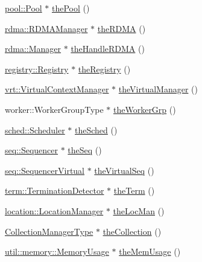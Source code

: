 \begin{DoxyCompactItemize}
\item 
\hyperlink{structvt_1_1pool_1_1_pool}{pool\+::\+Pool} $\ast$ \hyperlink{namespacevt_aab3530d89a64e5ea903b0ccf303ecbb7}{the\+Pool} ()
\item 
\hyperlink{structvt_1_1rdma_1_1_r_d_m_a_manager}{rdma\+::\+R\+D\+M\+A\+Manager} $\ast$ \hyperlink{namespacevt_a68b8410bc2b86d3b5228d7dbb6b40bac}{the\+R\+D\+MA} ()
\item 
\hyperlink{structvt_1_1rdma_1_1_manager}{rdma\+::\+Manager} $\ast$ \hyperlink{namespacevt_aecb87ec2c40b5b7fc57ba4cf8ea838b0}{the\+Handle\+R\+D\+MA} ()
\item 
\hyperlink{structvt_1_1registry_1_1_registry}{registry\+::\+Registry} $\ast$ \hyperlink{namespacevt_a8b5994a5aedabc64006ce820db2e938c}{the\+Registry} ()
\item 
\hyperlink{structvt_1_1vrt_1_1_virtual_context_manager}{vrt\+::\+Virtual\+Context\+Manager} $\ast$ \hyperlink{namespacevt_ad46b232b74b745991314a4a509c648f9}{the\+Virtual\+Manager} ()
\item 
worker\+::\+Worker\+Group\+Type $\ast$ \hyperlink{namespacevt_a863076a26364a6b752199a556e54fd60}{the\+Worker\+Grp} ()
\item 
\hyperlink{structvt_1_1sched_1_1_scheduler}{sched\+::\+Scheduler} $\ast$ \hyperlink{namespacevt_a4508b38e6ab664b64f1415aecbb83571}{the\+Sched} ()
\item 
\hyperlink{structvt_1_1seq_1_1_sequencer}{seq\+::\+Sequencer} $\ast$ \hyperlink{namespacevt_a4a7d07c845b311da59286de486d623c7}{the\+Seq} ()
\item 
\hyperlink{structvt_1_1seq_1_1_sequencer_virtual}{seq\+::\+Sequencer\+Virtual} $\ast$ \hyperlink{namespacevt_abdbb9ddb0d79b35c89e9d742d3fc9d42}{the\+Virtual\+Seq} ()
\item 
\hyperlink{structvt_1_1term_1_1_termination_detector}{term\+::\+Termination\+Detector} $\ast$ \hyperlink{namespacevt_a127580fdfcaba0b4171e5c48c5676733}{the\+Term} ()
\item 
\hyperlink{structvt_1_1location_1_1_location_manager}{location\+::\+Location\+Manager} $\ast$ \hyperlink{namespacevt_ace1c9d64e09732e3b7414d02517ecfdb}{the\+Loc\+Man} ()
\item 
\hyperlink{namespacevt_a290f7e8941f9f411b54cdb15b6cea107}{Collection\+Manager\+Type} $\ast$ \hyperlink{namespacevt_a1c45ce63bfd2c327ff7d76a319a371d8}{the\+Collection} ()
\item 
\hyperlink{structvt_1_1util_1_1memory_1_1_memory_usage}{util\+::memory\+::\+Memory\+Usage} $\ast$ \hyperlink{namespacevt_a38d485d3cf840b9a623e47e7754ef72e}{the\+Mem\+Usage} ()

\end{DoxyCompactItemize}
